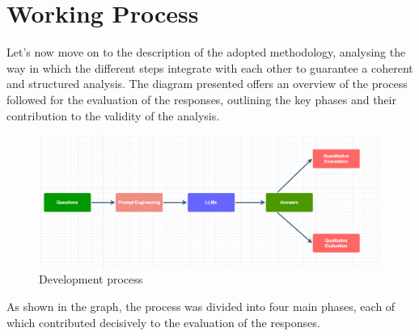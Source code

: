 \section{Working Process}
Let's now move on to the description of the adopted methodology, analysing the way in which the different steps integrate with each other to guarantee a coherent and structured analysis. The diagram presented offers an overview of the process followed for the evaluation of the responses, outlining the key phases and their contribution to the validity of the analysis.
\begin{figure}[h]
    \centering
    \includegraphics[width=0.7\linewidth]{Figures/Process.png}
    \caption{Development process}
    \label{fig:graph}
\end{figure}
As shown in the graph, the process was divided into four main phases, each of which contributed decisively to the evaluation of the responses.
